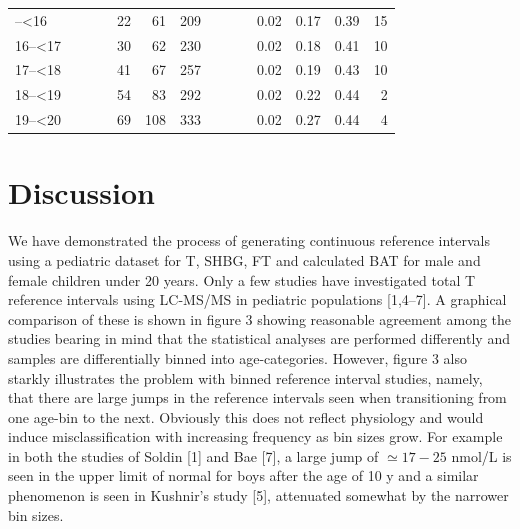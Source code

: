 \documentclass[]{elsarticle} %
\begin{document}
\begin{table}[H]
\begin{tabular}[t]{l>{}r>{}r>{}rrrr>{}r>{}r>{}rrrrr}
\addlinespace
15--<16 & \cellcolor[HTML]{ececec}{0.08} & \cellcolor[HTML]{ececec}{0.56} & \cellcolor[HTML]{ececec}{1.47} & 22 & 61 & 209 & \cellcolor[HTML]{ececec}{0.99} & \cellcolor[HTML]{ececec}{7.29} & \cellcolor[HTML]{ececec}{16.50} & 0.02 & 0.17 & 0.39 & 15\\
16--<17 & \cellcolor[HTML]{ececec}{0.11} & \cellcolor[HTML]{ececec}{0.55} & \cellcolor[HTML]{ececec}{1.41} & 30 & 62 & 230 & \cellcolor[HTML]{ececec}{1.00} & \cellcolor[HTML]{ececec}{7.57} & \cellcolor[HTML]{ececec}{17.44} & 0.02 & 0.18 & 0.41 & 10\\
17--<18 & \cellcolor[HTML]{ececec}{0.16} & \cellcolor[HTML]{ececec}{0.60} & \cellcolor[HTML]{ececec}{1.36} & 41 & 67 & 257 & \cellcolor[HTML]{ececec}{1.00} & \cellcolor[HTML]{ececec}{8.14} & \cellcolor[HTML]{ececec}{18.13} & 0.02 & 0.19 & 0.43 & 10\\
18--<19 & \cellcolor[HTML]{ececec}{0.21} & \cellcolor[HTML]{ececec}{0.74} & \cellcolor[HTML]{ececec}{1.38} & 54 & 83 & 292 & \cellcolor[HTML]{ececec}{0.97} & \cellcolor[HTML]{ececec}{9.38} & \cellcolor[HTML]{ececec}{18.58} & 0.02 & 0.22 & 0.44 & 2\\
19--<20 & \cellcolor[HTML]{ececec}{0.28} & \cellcolor[HTML]{ececec}{1.00} & \cellcolor[HTML]{ececec}{1.48} & 69 & 108 & 333 & \cellcolor[HTML]{ececec}{0.92} & \cellcolor[HTML]{ececec}{11.38} & \cellcolor[HTML]{ececec}{18.78} & 0.02 & 0.27 & 0.44 & 4\\
\bottomrule
\end{tabular}
\end{table}

\hypertarget{discussion}{%
\section{Discussion}\label{discussion}}

We have demonstrated the process of generating continuous reference
intervals using a pediatric dataset for T, SHBG, FT and calculated BAT
for male and female children under 20 years. Only a few studies have
investigated total T reference intervals using LC-MS/MS in pediatric
populations {[}1,4--7{]}. A graphical comparison of these is shown in
figure 3 showing reasonable agreement among the studies bearing in mind
that the statistical analyses are performed differently and samples are
differentially binned into age-categories. However, figure 3 also
starkly illustrates the problem with binned reference interval studies,
namely, that there are large jumps in the reference intervals seen when
transitioning from one age-bin to the next. Obviously this does not
reflect physiology and would induce misclassification with increasing
frequency as bin sizes grow. For example in both the studies of Soldin
{[}1{]} and Bae {[}7{]}, a large jump of \(\simeq 17-25\) nmol/L is seen
in the upper limit of normal for boys after the age of 10 y and a
similar phenomenon is seen in Kushnir's study {[}5{]}, attenuated
somewhat by the narrower bin sizes.
\end{document}
